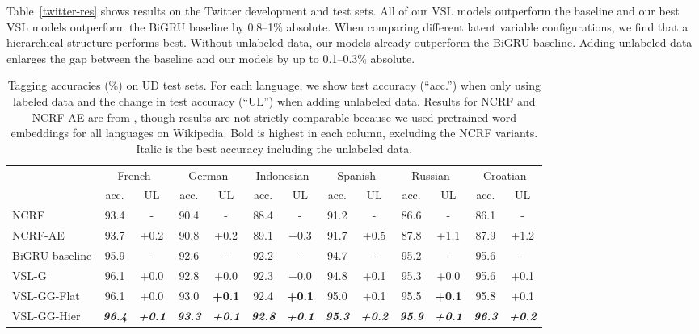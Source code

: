 \documentclass[11pt,a4paper]{article}
\newcommand{\vsmg}{VSL-G\xspace}
\newcommand{\vsmggflat}{VSL-GG-Flat\xspace}
\newcommand{\vsmgghier}{VSL-GG-Hier\xspace}
\begin{document}
Table~\ref{twitter-res} shows results on the Twitter development and test sets.
All of our VSL models outperform the baseline and our best VSL models outperform the BiGRU baseline by 0.8\---1\% absolute. When comparing different latent variable configurations, we find that a hierarchical structure performs best. Without unlabeled data, our models already outperform the BiGRU baseline.
Adding unlabeled data enlarges the gap between the baseline and our models by up to 0.1\---0.3\% absolute.


\begin{table*}[t]
\setlength{\tabcolsep}{4pt}
\centering
\begin{tabular}{l|c|c|c|c|c|c|c|c|c|c|c|c}
        & \multicolumn{2}{c|}{French} & \multicolumn{2}{c|}{German} & \multicolumn{2}{c|}{Indonesian} & \multicolumn{2}{c|}{Spanish} & \multicolumn{2}{c|}{Russian} & \multicolumn{2}{c}{Croatian} \\
        & \multicolumn{1}{c}{acc.} & UL
        & \multicolumn{1}{c}{acc.} & UL
        & \multicolumn{1}{c}{acc.} & UL
        & \multicolumn{1}{c}{acc.} & UL
        & \multicolumn{1}{c}{acc.} & UL
        & \multicolumn{1}{c}{acc.} & UL \\
\hline
NCRF               & 93.4 &   -  & 90.4 &   -   & 88.4 &   -  & 91.2 &   -  & 86.6 &   -  & 86.1 &  -   \\
NCRF-AE            & 93.7 & +0.2 & 90.8 & +0.2  & 89.1 & +0.3 & 91.7 & +0.5 & 87.8 & +1.1 & 87.9 & +1.2 \\
\hline
BiGRU baseline     & 95.9 &   -   & 92.6 &   -  & 92.2 &   -   & 94.7 &   -  & 95.2 &   -  & 95.6 &  -   \\
\vsmg              & 96.1 & +0.0  & 92.8  & +0.0 & 92.3 & +0.0 & 94.8 & +0.1 & 95.3 & +0.0 & 95.6 &  +0.1  \\
\vsmggflat         & 96.1 & +0.0  & 93.0  & \textbf{+0.1} & 92.4 & \textbf{+0.1} & 95.0 & +0.1 & 95.5 & \textbf{+0.1} & 95.8 & +0.1 \\
\vsmgghier         & \textit{\textbf{96.4}} & \textit{\textbf{+0.1}}  & \textit{\textbf{93.3}} & \textit{\textbf{+0.1}} & \textit{\textbf{92.8}} & \textit{\textbf{+0.1}} & \textit{\textbf{95.3}} & \textit{\textbf{+0.2}} & \textit{\textbf{95.9}} & \textit{\textbf{+0.1}} & \textit{\textbf{96.3}} & \textit{\textbf{+0.2}} \\
\end{tabular}
\caption{Tagging accuracies (\%) on UD test sets. For each language, we show test accuracy (``acc.'') when only using labeled data and the change in test accuracy (``UL'') when adding unlabeled data. Results for NCRF and NCRF-AE are from \citet{zhang2017semi}, though results are not strictly comparable because we used pretrained word embeddings for all languages on Wikipedia. Bold is highest in each column, excluding the NCRF variants. Italic is the best accuracy including the unlabeled data.
}
\label{ud-res}
\end{table*}
\end{document}
